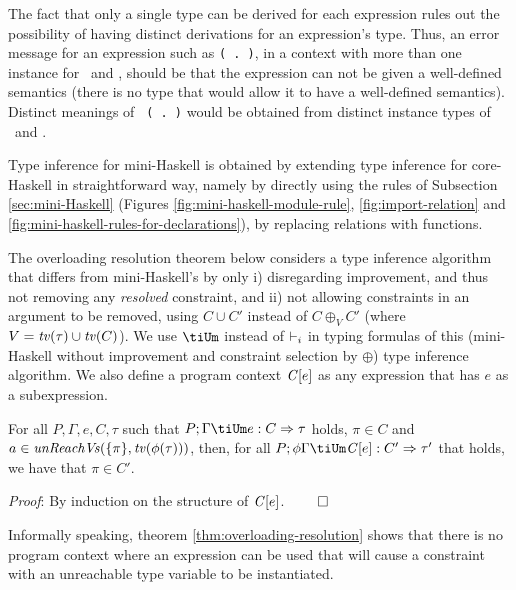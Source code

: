 The fact that only a single type can be derived for each expression
rules out the possibility of having distinct derivations for an
expression's type. Thus, an error message for an expression such as
{\tt (\sshow\ $\!\!$.$\!\!$ \rread)}, in a context with more than one
instance for \SShow\ and \RRead, should be that the expression can not
be given a well-defined semantics (there is no type that would allow
it to have a well-defined semantics). Distinct meanings of {\tt
  (\sshow\ $\!\!$.$\!\!$ \rread)} would be obtained from distinct
instance types of \sshow\ and \rread.

Type inference for mini-Haskell is obtained by extending type
inference for core-Haskell in straightforward way, namely by directly
using the rules of Subsection \ref{sec:mini-Haskell} (Figures
\ref{fig:mini-haskell-module-rule}, \ref{fig:import-relation} and
\ref{fig:mini-haskell-rules-for-declarations}), by replacing relations
with functions.

The overloading resolution theorem below considers a type inference
algorithm that differs from mini-Haskell's by only i) disregarding
improvement, and thus not removing any {\em resolved\/} constraint,
and ii) not allowing constraints in an argument to be removed, using
$C \cup C'$ instead of $C \oplus_V C'$ (where $V = {\it tv\/}(\tau)\cup
{\it tv\/}(C)$). We use $\tiUm$ instead of $\vdash_i$ in typing formulas of this
(mini-Haskell without improvement and constraint selection by
$\oplus$) type inference algorithm. We also define a program context
$\mathit{C\/}[e]$ as any expression that has $e$ as a subexpression.

\begin{Theorem}
  For all $P, \Gamma, e, C, \tau$ such that $P;\Gamma \tiUm e:
  C\Rightarrow \tau$ holds, $\pi\in C$ and
  $a\in\text{\it unReachVs\/}(\{\pi\},{\it tv\/}(\phi(\tau)))$, then, for all
  $P;\phi\Gamma\tiUm\CO[e]: C'\Rightarrow \tau'$ that holds, we have
  that $\pi \in C'$.
\label{thm:overloading-resolution}
\end{Theorem}

{\em Proof\/}: By induction on the structure of $\mathit{C\/}[e]$. $\qed$

Informally speaking, theorem \ref{thm:overloading-resolution} shows
that there is no program context where an expression can be used that
will cause a constraint with an unreachable type variable to be
instantiated.


